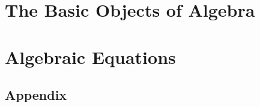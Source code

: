 \part{The Basic Objects of Algebra}


\part{Algebraic Equations}


\begin{appendices}
\renewcommand{\thepart}{}%
\part{Appendix}

\end{appendices}



\newpage
\backmatter
{}


\newpage
{}
\printindex
\newpage
{}
\printnomenclature

